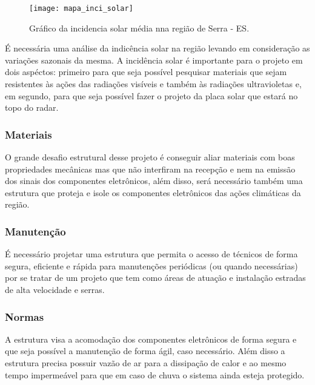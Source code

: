 \begin{figure}[!h]
	\texttt{[image: mapa\_inci\_solar]}
	\centering
	\caption{Gráfico da incidencia solar média nna região de Serra - ES.}
\end{figure}

É necessária uma análise da indicência solar na região levando em consideração as variações sazonais da mesma. A incidência solar é importante para o projeto em dois aspéctos: primeiro para que seja possível pesquisar materiais que sejam resistentes às ações das radiações  visíveis e também às radiações ultravioletas e, em segundo, para que seja possível fazer o projeto da placa solar que estará no topo do radar.

\subsubsection{Materiais}

O grande desafio estrutural desse projeto é conseguir aliar materiais com boas propriedades mecânicas mas que não interfiram na recepção e nem na emissão dos sinais dos componentes eletrônicos, além disso, será necessário também uma estrutura que proteja e isole os componentes eletrônicos das ações climáticas da região. 

\subsubsection{Manutenção}

É necessário projetar uma estrutura que permita o acesso de técnicos de forma segura, eficiente e rápida para manutenções periódicas (ou quando necessárias) por se tratar de um projeto que tem como áreas de atuação e instalação estradas de alta velocidade e serras.

\subsubsection{Normas}

A estrutura visa a acomodação dos componentes eletrônicos de forma segura e que
seja possível a manutenção de forma ágil, caso necessário. Além disso a estrutura
precisa possuir vazão de ar para a dissipação de calor e ao mesmo tempo
impermeável para que em caso de chuva o sistema ainda esteja protegido.

